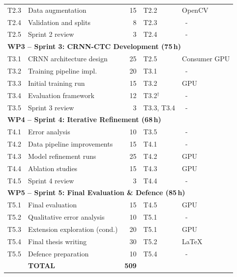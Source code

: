 \documentclass[11pt, a4paper]{article}
\begin{document}
\begin{table}[h!]
\begin{tabularx}{\linewidth}{c >{\raggedright}p{4.2cm} r >{\raggedright\arraybackslash}p{2.2cm} >{\raggedright\arraybackslash}p{2.0cm}}
        T2.3 & Data augmentation                    & 15  & T2.2           & OpenCV \\
        T2.4 & Validation and splits                & 8   & T2.3           &~-~\\
        T2.5 & Sprint 2 review                      & 3   & T2.4           &~-~\\
        \midrule
        \multicolumn{5}{l}{\textbf{WP3 -- Sprint 3: CRNN-CTC Development (75\,h)}} \\
        \midrule
        T3.1 & CRNN architecture design             & 25  & T2.5           & Consumer GPU \\
        T3.2 & Training pipeline impl.              & 20  & T3.1           &~-~\\
        T3.3 & Initial training run                 & 15  & T3.2           & GPU \\
        T3.4 & Evaluation framework                 & 12  & T3.2$^\dagger$ &~-~\\
        T3.5 & Sprint 3 review                      & 3   & T3.3, T3.4     &~-~\\
        \midrule
        \multicolumn{5}{l}{\textbf{WP4 -- Sprint 4: Iterative Refinement (68\,h)}} \\
        \midrule
        T4.1 & Error analysis                       & 10  & T3.5           &~-~\\
        T4.2 & Data pipeline improvements           & 15  & T4.1           &~-~\\
        T4.3 & Model refinement runs                & 25  & T4.2           & GPU \\
        T4.4 & Ablation studies                     & 15  & T4.3           & GPU \\
        T4.5 & Sprint 4 review                      & 3   & T4.4           &~-~\\
        \midrule
        \multicolumn{5}{l}{\textbf{WP5 -- Sprint 5: Final Evaluation \& Defence (85\,h)}} \\
        \midrule
        T5.1 & Final evaluation                     & 15  & T4.5           & GPU \\
        T5.2 & Qualitative error analysis           & 10  & T5.1           &~-~\\
        T5.3 & Extension exploration (cond.)        & 20  & T5.1           & GPU \\
        T5.4 & Final thesis writing                 & 30  & T5.2           & \LaTeX{} \\
        T5.5 & Defence preparation                  & 10  & T5.4           &~-~\\
        \midrule
        & \textbf{TOTAL}                            & \textbf{509} & & \\
        \bottomrule
    \end{tabularx}
\end{table}
\end{document}
